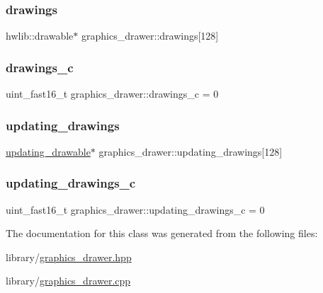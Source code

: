 \subsubsection{\texorpdfstring{drawings}{drawings}}
{\footnotesize\ttfamily hwlib\+::drawable$\ast$ graphics\+\_\+drawer\+::drawings\mbox{[}128\mbox{]}\hspace{0.3cm}{\ttfamily [protected]}}

\mbox{\label{classgraphics__drawer_a432b568a14d6ce8b746dcce5901714dd}} 
\subsubsection{\texorpdfstring{drawings\+\_\+c}{drawings\_c}}
{\footnotesize\ttfamily uint\+\_\+fast16\+\_\+t graphics\+\_\+drawer\+::drawings\+\_\+c = 0\hspace{0.3cm}{\ttfamily [protected]}}

\mbox{\label{classgraphics__drawer_a596f6deb608444d694f8c97bf949d7e0}} 
\subsubsection{\texorpdfstring{updating\+\_\+drawings}{updating\_drawings}}
{\footnotesize\ttfamily \hyperlink{classupdating__drawable}{updating\+\_\+drawable}$\ast$ graphics\+\_\+drawer\+::updating\+\_\+drawings\mbox{[}128\mbox{]}\hspace{0.3cm}{\ttfamily [protected]}}

\mbox{\label{classgraphics__drawer_a2bdb91885928251f6c0d0c94593e2200}} 
\subsubsection{\texorpdfstring{updating\+\_\+drawings\+\_\+c}{updating\_drawings\_c}}
{\footnotesize\ttfamily uint\+\_\+fast16\+\_\+t graphics\+\_\+drawer\+::updating\+\_\+drawings\+\_\+c = 0\hspace{0.3cm}{\ttfamily [protected]}}



The documentation for this class was generated from the following files\+:\begin{DoxyCompactItemize}
\item 
library/\hyperlink{graphics__drawer_8hpp}{graphics\+\_\+drawer.\+hpp}\item 
library/\hyperlink{graphics__drawer_8cpp}{graphics\+\_\+drawer.\+cpp}\end{DoxyCompactItemize}
